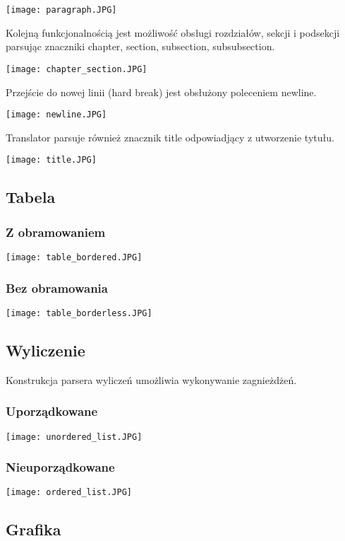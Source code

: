 \texttt{[image: paragraph.JPG]}


Kolejną funkcjonalnością jest możliwość obsługi rozdziałów, sekcji i podsekcji parsując znaczniki chapter, section, subsection, 
subsubsection.


\texttt{[image: chapter\_section.JPG]}


Przejście do nowej linii (hard break) jest obsłużony poleceniem newline.

\texttt{[image: newline.JPG]}


Translator parsuje również znacznik title odpowiadjący z utworzenie tytułu.

\texttt{[image: title.JPG]}

\subsection{Tabela}

\subsubsection{Z obramowaniem}

\texttt{[image: table\_bordered.JPG]}

\subsubsection{Bez obramowania}

\texttt{[image: table\_borderless.JPG]}


\subsection{Wyliczenie}

Konstrukcja parsera wyliczeń umożliwia wykonywanie zagnieżdżeń.

\subsubsection{Uporządkowane}

\texttt{[image: unordered\_list.JPG]}

\subsubsection{Nieuporządkowane}

\texttt{[image: ordered\_list.JPG]}

\subsection{Grafika}

